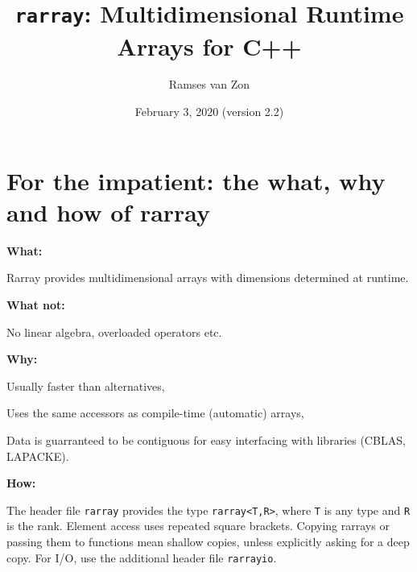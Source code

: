 \documentclass[11pt,twoside]{article}
\newcommand{\cxx}{C{++}}
\begin{document}
\setlength{\parskip}{1mm}

\title{\texttt{rarray}: Multidimensional Runtime Arrays for \cxx}

\author{Ramses van Zon%
\vspace{-8pt}} 

\date{February 3, 2020 (version 2.2)\vspace{-7mm}}

\maketitle

\section{For the impatient: the what, why and how of rarray}

\noindent\textbf{What:}

Rarray provides multidimensional arrays with dimensions determined at runtime. 

\noindent\textbf{What not:} 

No linear algebra, overloaded operators etc.

\noindent\textbf{Why:} 

Usually faster than alternatives,

Uses the same accessors as compile-time (automatic) arrays,

Data is guarranteed to be contiguous for easy interfacing with
libraries (CBLAS, LAPACKE).

\noindent\textbf{How:}

The header file \texttt{rarray} provides the type \texttt{rarray<T,R>}, where \texttt{T} is any type and {\tt R} is the rank. Element access uses repeated square brackets. Copying rarrays or passing them to functions mean shallow copies, unless explicitly asking for a deep copy. For I/O, use the additional header file \texttt{rarrayio}.

\
\end{document}
